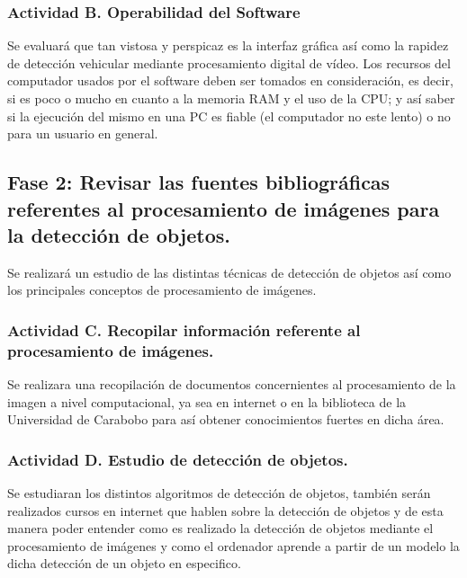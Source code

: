\subsubsection{Actividad B. Operabilidad del Software}

Se evaluar\'a que tan vistosa y perspicaz es la interfaz gráfica así como la rapidez de detección vehicular mediante procesamiento digital de vídeo. Los recursos del computador usados por el software deben ser tomados en consideración, es decir, si es poco o mucho en cuanto a la memoria RAM y el uso de la CPU; y así saber si la ejecución del mismo en una PC es fiable (el computador no este lento) o no para un usuario en general.


\subsection{Fase 2: Revisar las fuentes bibliográficas referentes al procesamiento de imágenes para la detección de objetos.}

Se realizar\'a un estudio de las distintas técnicas de detección de objetos así como los principales conceptos de procesamiento de imágenes.

\subsubsection{Actividad C. Recopilar información referente al procesamiento de imágenes.}

Se realizara una recopilación de documentos concernientes al procesamiento de la imagen a nivel computacional, ya sea en internet o en la biblioteca de la Universidad de Carabobo para así obtener conocimientos fuertes en dicha área.

\subsubsection{Actividad D. Estudio de detección de objetos.}

Se estudiaran los distintos algoritmos de detección de objetos, también serán realizados cursos en internet que hablen sobre la detección de objetos y de esta manera poder entender como es realizado la detección de objetos mediante el procesamiento de imágenes y como el ordenador aprende a partir de un modelo la dicha detección de un objeto en especifico. 


